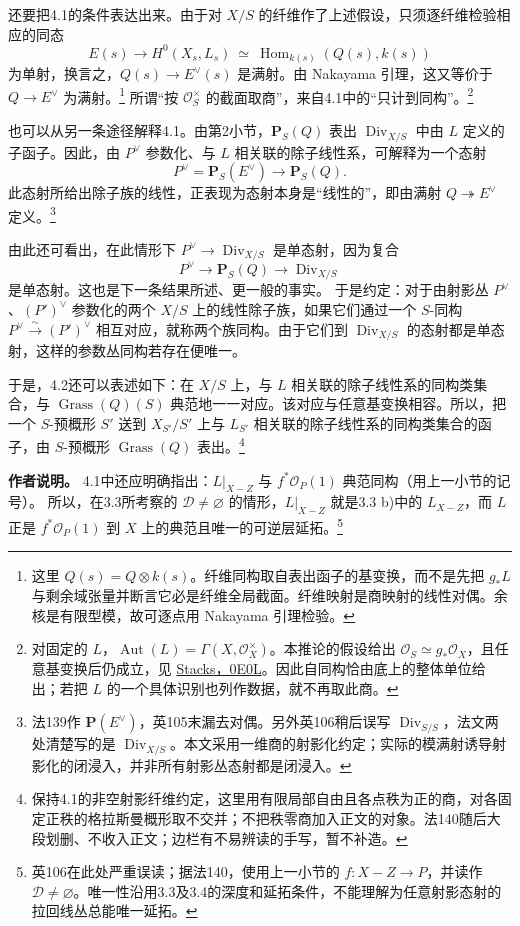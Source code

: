 \documentclass[openany,fontset=fandol]{ctexbook}
\DeclareMathOperator{\Hom}{Hom}
\DeclareMathOperator{\Grass}{Grass}
\DeclareMathOperator{\Div}{Div}
\newcommand{\OO}{\mathcal O}
\newcommand{\PP}{\mathbf P}
\begin{document}
还要把4.1的条件表达出来。由于对 \(X/S\) 的纤维作了上述假设，只须逐纤维检验相应的同态
\[
 E(s)\longrightarrow H^0(X_s,L_s)
 \ \simeq\ \Hom_{k(s)}(Q(s),k(s))
\]
为单射，换言之，\(Q(s)\to E^\vee(s)\) 是满射。由 Nakayama 引理，这又等价于 \(Q\to E^\vee\) 为满射。\footnote{这里 \(Q(s)=Q\otimes k(s)\)。纤维同构取自表出函子的基变换，而不是先把 \(g_*L\) 与剩余域张量并断言它必是纤维全局截面。纤维映射是商映射的线性对偶。余核是有限型模，故可逐点用 Nakayama 引理检验。}
所谓“按 \(\OO_S^\times\) 的截面取商”，来自4.1中的“只计到同构”。\footnote{对固定的 \(L\)，\(\operatorname{Aut}(L)=\Gamma(X,\OO_X^\times)\)。本推论的假设给出 \(\OO_S\simeq g_*\OO_X\)，且任意基变换后仍成立，见 \href{https://stacks.math.columbia.edu/tag/0E0L}{Stacks，0E0L}。因此自同构恰由底上的整体单位给出；若把 \(L\) 的一个具体识别也列作数据，就不再取此商。}

也可以从另一条途径解释4.1。由第2小节，\(\PP_S(Q)\) 表出 \(\Div_{X/S}\) 中由 \(L\) 定义的子函子。因此，由 \(P^\vee\) 参数化、与 \(L\) 相关联的除子线性系，可解释为一个态射
\[
 P^\vee=\PP_S(E^\vee)\longrightarrow\PP_S(Q).
\]
此态射所给出除子族的线性，正表现为态射本身是“线性的”，即由满射 \(Q\twoheadrightarrow E^\vee\) 定义。\footnote{法139作 \(\PP(E^\vee)\)，英105末漏去对偶。另外英106稍后误写 \(\Div_{S/S}\)，法文两处清楚写的是 \(\Div_{X/S}\)。本文采用一维商的射影化约定；实际的模满射诱导射影化的闭浸入，并非所有射影丛态射都是闭浸入。}

由此还可看出，在此情形下 \(P^\vee\to\Div_{X/S}\) 是单态射，因为复合
\[
 P^\vee\longrightarrow\PP_S(Q)\longrightarrow\Div_{X/S}
\]
是单态射。这也是下一条结果所述、更一般的事实。
于是约定：对于由射影丛 \(P^\vee\)、\((P')^\vee\) 参数化的两个 \(X/S\) 上的线性除子族，如果它们通过一个 \(S\)-同构 \(P^\vee\xrightarrow{\sim}(P')^\vee\) 相互对应，就称两个族同构。由于它们到 \(\Div_{X/S}\) 的态射都是单态射，这样的参数丛同构若存在便唯一。

于是，4.2还可以表述如下：在 \(X/S\) 上，与 \(L\) 相关联的除子线性系的同构类集合，与 \(\Grass(Q)(S)\) 典范地一一对应。该对应与任意基变换相容。所以，把一个 \(S\)-预概形 \(S'\) 送到 \(X_{S'}/S'\) 上与 \(L_{S'}\) 相关联的除子线性系的同构类集合的函子，由 \(S\)-预概形 \(\Grass(Q)\) 表出。\footnote{保持4.1的非空射影纤维约定，这里用有限局部自由且各点秩为正的商，对各固定正秩的格拉斯曼概形取不交并；不把秩零商加入正文的对象。法140随后大段划删、不收入正文；边栏有不易辨读的手写，暂不补造。}

\medskip
\noindent\textbf{作者说明。}
4.1中还应明确指出：\(L|_{X-Z}\) 与 \(f^*\OO_P(1)\) 典范同构（用上一小节的记号）。
所以，在3.3所考察的 \(\mathcal D\ne\varnothing\) 的情形，\(L|_{X-Z}\) 就是3.3 b)中的 \(L_{X-Z}\)，而 \(L\) 正是 \(f^*\OO_P(1)\) 到 \(X\) 上的典范且唯一的可逆层延拓。\footnote{英106在此处严重误读；据法140，使用上一小节的 \(f:X-Z\to P\)，并读作 \(\mathcal D\ne\varnothing\)。唯一性沿用3.3及3.4的深度和延拓条件，不能理解为任意射影态射的拉回线丛总能唯一延拓。}
\end{document}
